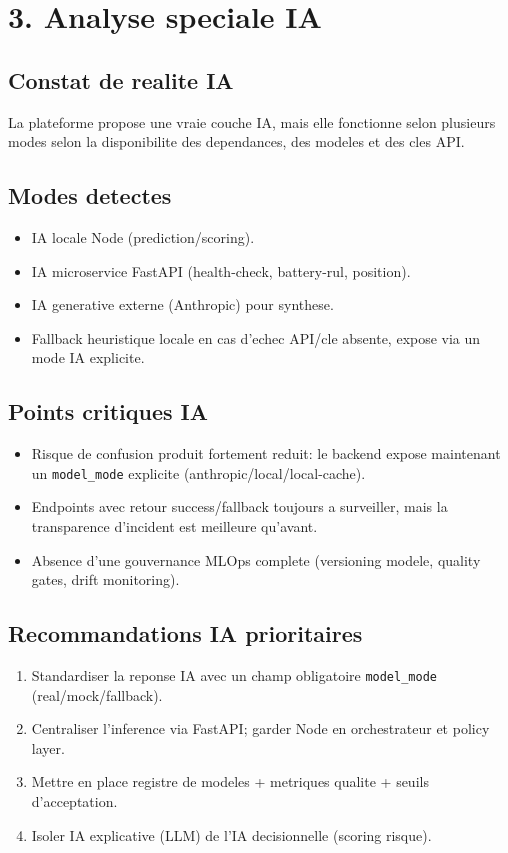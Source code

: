 \documentclass[12pt,a4paper]{article}
\begin{document}
\section{3. Analyse speciale IA}
\subsection{Constat de realite IA}
La plateforme propose une vraie couche IA, mais elle fonctionne selon plusieurs modes selon la disponibilite des dependances, des modeles et des cles API.

\subsection{Modes detectes}
\begin{itemize}
  \item IA locale Node (prediction/scoring).
  \item IA microservice FastAPI (health-check, battery-rul, position).
  \item IA generative externe (Anthropic) pour synthese.
  \item Fallback heuristique locale en cas d'echec API/cle absente, expose via un mode IA explicite.
\end{itemize}

\subsection{Points critiques IA}
\begin{itemize}
  \item Risque de confusion produit fortement reduit: le backend expose maintenant un \texttt{model\_mode} explicite (anthropic/local/local-cache).
  \item Endpoints avec retour success/fallback toujours a surveiller, mais la transparence d'incident est meilleure qu'avant.
  \item Absence d'une gouvernance MLOps complete (versioning modele, quality gates, drift monitoring).
\end{itemize}

\subsection{Recommandations IA prioritaires}
\begin{enumerate}
  \item Standardiser la reponse IA avec un champ obligatoire \texttt{model\_mode} (real/mock/fallback).
  \item Centraliser l'inference via FastAPI; garder Node en orchestrateur et policy layer.
  \item Mettre en place registre de modeles + metriques qualite + seuils d'acceptation.
  \item Isoler IA explicative (LLM) de l'IA decisionnelle (scoring risque).
\end{enumerate}
\end{document}
